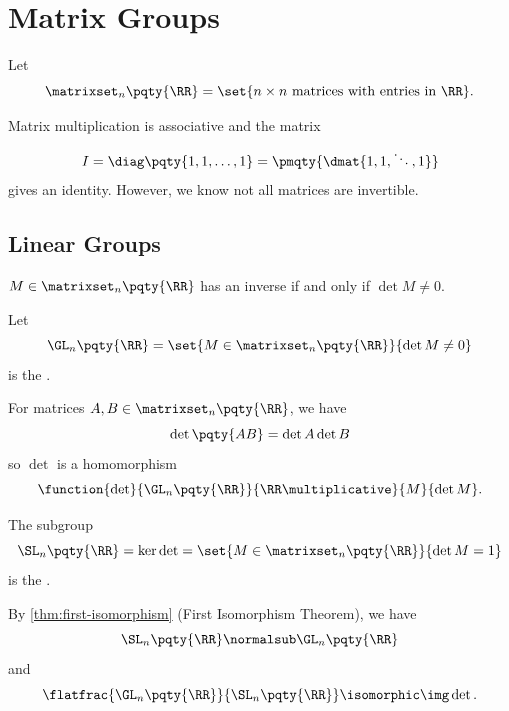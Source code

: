 \section{Matrix Groups}
\label{sec:matrix-groups}

Let
\[
    \matrixset_n\pqty{\RR} = \set{n \times n \text{ matrices with entries in } \RR}.
\]

Matrix multiplication is associative and the matrix
\[
    I = \diag\pqty{1, 1, \ldots, 1} = \pmqty{\dmat{1, 1, \ddots, 1}}
\]
gives an identity. However, we know not all matrices are invertible.

\subsection{Linear Groups}
\label{sec:linear-groups}

\begin{lemma}
    \label{lem:invertible-matrices}%
    \(M \in \matrixset_n\pqty{\RR}\) has an inverse if and only if \(\det M \neq 0\).
\end{lemma}

\begin{definition}
    \label{def:general-linear}%
    Let
    \[
        \GL_n\pqty{\RR} = \set{M \in \matrixset_n \pqty{\RR}}{\det M \neq 0}
    \]
    is the .
\end{definition}

\begin{lemma}
    \label{lem:determinant}%
    For matrices \(A, B \in \matrixset_n\pqty{\RR}\), we have
    \[
        \det\pqty{AB} = \det A \det B
    \]
    so \(\det\) is a homomorphism
    \[
        \function{\det}{\GL_n\pqty{\RR}}{\RR\multiplicative}{M}{\det M}.
    \]
\end{lemma}

\begin{definition}
    \label{def:special-linear}%
    The subgroup
    \[
        \SL_n\pqty{\RR} = \ker \det = \set{M \in \matrixset_n \pqty{\RR}}{\det M = 1}
    \]
    is the .
\end{definition}

By \autoref{thm:first-isomorphism} (First Isomorphism Theorem), we have
\[
    \SL_n\pqty{\RR} \normalsub \GL_n\pqty{\RR}
\]
and
\[
    \flatfrac{\GL_n\pqty{\RR}}{\SL_n\pqty{\RR}} \isomorphic \img\det.
\]

